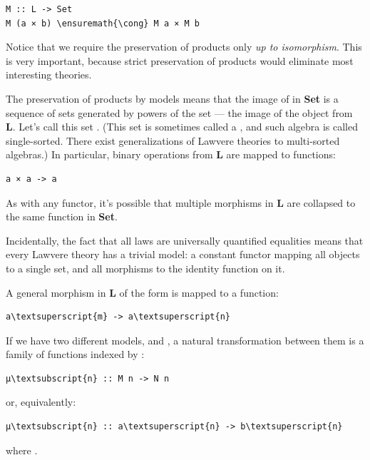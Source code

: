 \begin{Verbatim}[commandchars=\\\{\}]
M :: L -> Set
M (a × b) \ensuremath{\cong} M a × M b
\end{Verbatim}
Notice that we require the preservation of products only \emph{up to
isomorphism}. This is very important, because strict preservation of
products would eliminate most interesting theories.

The preservation of products by models means that the image of
 in \textbf{Set} is a sequence of sets generated by powers of
the set  --- the image of the object  from
\textbf{L}. Let's call this set . (This set is sometimes
called a , and such algebra is called single-sorted. There
exist generalizations of Lawvere theories to multi-sorted algebras.) In
particular, binary operations from \textbf{L} are mapped to functions:

\begin{Verbatim}[commandchars=\\\{\}]
a × a -> a
\end{Verbatim}
As with any functor, it's possible that multiple morphisms in \textbf{L}
are collapsed to the same function in \textbf{Set}.

Incidentally, the fact that all laws are universally quantified
equalities means that every Lawvere theory has a trivial model: a
constant functor mapping all objects to a single set, and all morphisms
to the identity function on it.

A general morphism in \textbf{L} of the form
 is mapped to a function:

\begin{Verbatim}[commandchars=\\\{\}]
a\textsuperscript{m} -> a\textsuperscript{n}
\end{Verbatim}
If we have two different models,  and , a natural
transformation between them is a family of functions indexed by
:

\begin{Verbatim}[commandchars=\\\{\}]
μ\textsubscript{n} :: M n -> N n
\end{Verbatim}
or, equivalently:

\begin{Verbatim}[commandchars=\\\{\}]
μ\textsubscript{n} :: a\textsuperscript{n} -> b\textsuperscript{n}
\end{Verbatim}
where .

